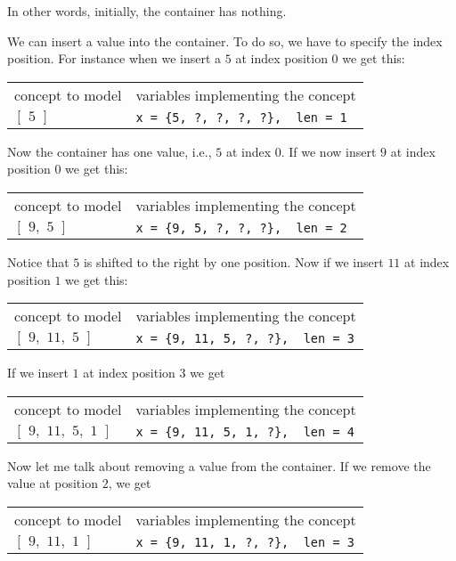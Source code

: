 In other words, initially, the container has nothing.

We can insert a value into the container.
To do so, we have to specify the index position.
For instance when we insert a $5$ at index position $0$ we get this:

\begin{longtable}{ll}
concept to model & \hspace{3 cm}variables implementing the concept \\
$[\,\,5\,\,]$ & \hspace{3 cm}\verb!x = {5, ?, ?, ?, ?},  len = 1!
\end{longtable}

Now the container has one value, i.e., $5$ at index 0.
If we now insert $9$ at index position $0$ we get this:

\begin{longtable}{ll}
concept to model & \hspace{3 cm}variables implementing the concept \\
$[\,\,9,\,\,5\,\,]$ & \hspace{3 cm}\verb!x = {9, 5, ?, ?, ?},  len = 2!
\end{longtable}

Notice that $5$ is shifted to the right by one position.
Now if we insert $11$ at index position $1$ we get this:

\begin{longtable}{ll}
concept to model & \hspace{3 cm}variables implementing the concept \\
$[\,\,9,\,\,11,\,\,5\,\,]$ & \hspace{3 cm}\verb!x = {9, 11, 5, ?, ?},  len = 3!
\end{longtable}

If we insert $1$ at index position $3$ we get

\begin{longtable}{ll}
concept to model & \hspace{3 cm}variables implementing the concept \\
$[\,\,9,\,\,11,\,\,5,\,\,1\,\,]$ & \hspace{3 cm}\verb!x = {9, 11, 5, 1, ?},  len = 4!
\end{longtable}

Now let me talk about removing a value from the container.
If we remove the value at position $2$, we get

\begin{longtable}{ll}
concept to model & \hspace{3 cm}variables implementing the concept \\
$[\,\,9,\,\,11,\,\,1\,\,]$ & \hspace{3 cm}\verb!x = {9, 11, 1, ?, ?},  len = 3!
\end{longtable}

